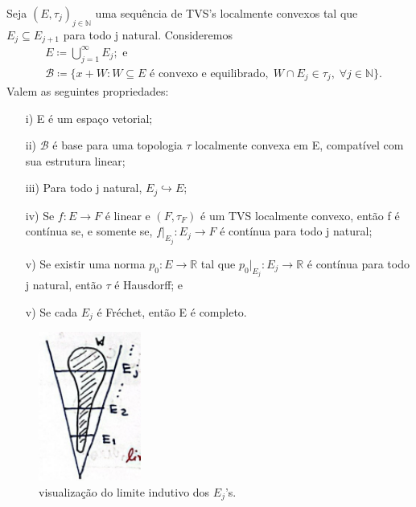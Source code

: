 \documentclass[../distribution_theory_notes.tex]{subfiles}
\begin{document}
\hypertarget{inductive_limit}{\begin{theorem*}
		Seja \((E, \tau_{j})_{j\in \mathbb{N}}\) uma sequência de TVS's localmente convexos tal que \(E_{j}\subseteq E_{j+1}\) para todo j natural. Consideremos
		\begin{align*}
			 & E \coloneqq \bigcup_{j=1}^{\infty}E_{j}; \text{ e}                                                                                \\
			 & \mathcal{B}\coloneqq \{x+W: W\subseteq E \text{ é convexo e equilibrado},\; W\cap E_{j}\in \tau_{j},\; \forall j\in \mathbb{N}\}.
		\end{align*}
		Valem as seguintes propriedades:
		\begin{itemize}
			\item[i)] E é um espaço vetorial;
			\item[ii)] \(\mathcal{B}\) é base para uma topologia \(\tau \) localmente convexa em E, compatível com sua estrutura linear;
			\item[iii)] Para todo j natural, \(E_{j}\hookrightarrow E\);
			\item[iv)] Se \(f:E\rightarrow F\) é linear e \((F,  \tau_{F})\) é um TVS localmente convexo, então f é contínua se, e somente se, \(f|_{E_{j}}:E_{j}\rightarrow F\) é contínua para todo j natural;
			\item[v)] Se existir uma norma \(p_{0}:E\rightarrow \mathbb{R}\) tal que \(p_{0}|_{E_{j}}:E_{j}\rightarrow \mathbb{R}\) é contínua para todo j natural, então \(\tau \) é Hausdorff; e
			\item[v)] Se cada \(E_{j}\) é Fréchet, então E é completo.
		\end{itemize}
	\end{theorem*}}
\begin{figure}[H]
	\begin{center}
		\includegraphics[height=0.3\textheight, width=0.3\textwidth, keepaspectratio]{./Images/inductive_limit_06.png}
	\end{center}
	\caption{visualização do limite indutivo dos \(E_{j}\)'s.}
\end{figure}
\end{document}
